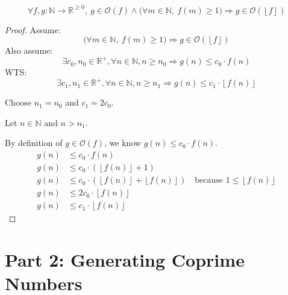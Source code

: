 \documentclass[fontsize=11pt]{article}
\newcommand{\N}{\mathbb{N}}
\newcommand{\R}{\mathbb{R}}
\newcommand{\cO}{\mathcal{O}}
\newcommand{\floor}[1]{\left\lfloor #1 \right\rfloor}
\begin{document}
\begin{enumerate}
$$\forall f, g: \N \to \R^{\geq 0},~ g \in \cO(f) \land \big(\forall m \in \N,~ f(m) \geq 1 \big) \Rightarrow g \in \cO(\floor{f})$$

\begin{proof}
Assume: $$\big(\forall m \in \N,~ f(m) \geq 1 \big) \Rightarrow g \in \cO(\floor{f})$$
Also assume: $$\exists c_0, n_0 \in \R^+, \forall n \in \N, n \geq n_0 \Rightarrow g(n) \leq c_0 \cdot f(n)$$
WTS: $$\exists c_1, n_1 \in \R^+, \forall n \in \N, n \geq n_1 \Rightarrow g(n) \leq c_1 \cdot \floor{f(n)}$$

Choose $n_1 = n_0$ and $c_1 = 2c_0$.

Let $n \in \N$ and $n > n_1$.

By definition of $g \in \cO(f)$, we know $g(n) \leq c_0 \cdot f(n)$.
\begin{align*}
    g(n) &\leq c_0 \cdot f(n)\\
    g(n) &\leq c_0 \cdot (\floor{f(n)} + 1)\\
    g(n) &\leq c_0 \cdot (\floor{f(n)} + \floor{f(n)}) \quad{\text{because } 1 \leq \floor{f(n)}} \\
    g(n) &\leq 2c_0 \cdot \floor{f(n)}\\
    g(n) &\leq c_1 \cdot \floor{f(n)}
\end{align*}
\end{proof}

\end{enumerate}

\newpage

\section*{Part 2: Generating Coprime Numbers}
\end{document}
